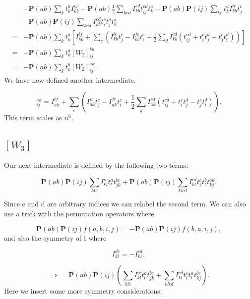 \documentclass[a4paper,norsk,11pt,twoside]{report}
\begin{document}
\begin{align}
& - \textbf{P}(ab) \sum_k t_k^a I_{kb}^{ij}
- \textbf{P}(ab) \frac{1}{2} \sum_{kcd} I_{kb}^{cd} t_{ij}^{cd} t_k^a
- \textbf{P}(ab) \textbf{P}(ij) \sum_{kc} t_k^a I_{kb}^{ic} t_j^c 
\nonumber \\
& - \textbf{P}(ab) \textbf{P}(ij) \sum_{kcd} I_{kb}^{cd} t_i^c t_j^d t_k^a
\nonumber \\
= &
- \textbf{P}(ab) \sum_k t_k^a \left[
I_{kb}^{ij} 
+ \sum_c \left( I_{kb}^{ic} t_j^c
- I_{kb}^{jc} t_i^c
+ \frac{1}{2} \sum_{d} I_{kb}^{cd} (t_{ij}^{cd}
+ t_i^c t_j^d - t_j^c t_i^d
) \right) \right]
\nonumber \\
= &
- \textbf{P}(ab) \sum_k t_k^a [W_2]_{ij}^{kb} \nonumber \\
= &
- \textbf{P}(ab) \sum_k t_k^b [W_2]_{ij}^{ak} .
\end{align}
We have now defined another intermediate.

\begin{equation}
[W_2]_{ij}^{ak} = I_{ak}^{ij} 
+ \sum_c \left( I_{ak}^{ic} t_j^c
- I_{ak}^{jc} t_i^c
+ \frac{1}{2} \sum_{d} I_{ak}^{cd} (t_{ij}^{cd}
+ t_i^c t_j^d - t_j^c t_i^d
) \right) . \label{intermedW2}
\end{equation}
This term scales as $n^6$.

\subsection{$[W_3]$}
Our next intermediate is defined by the following two terms:

\begin{equation}
\textbf{P}(ab) \textbf{P}(ij) \sum_{klc} I_{kl}^{ic} t_l^a t_{jk}^{bc}
+ \textbf{P}(ab) \textbf{P}(ij) \sum_{klcd} I_{kl}^{cd} t_i^c t_l^b t_{kj}^{ad} .
\end{equation}

Since c and d are arbitrary indices we can relabel the second term. We can also use a trick with the permutation operators where

\begin{equation}
\textbf{P}(ab) \textbf{P}(ij) f(a,b,i,j) = 
- \textbf{P}(ab) \textbf{P}(ij) f(b,a,i,j) ,
\end{equation}
and also the symmetry of I where

\begin{equation}
I_{kl}^{dc} = - I_{kl}^{cd} ,
\end{equation}

\begin{equation}
\Rightarrow =
\textbf{P}(ab) \textbf{P}(ij) \left(
\sum_{klc} I_{kl}^{ic} t_l^a t_{jk}^{bc}
+ \sum_{klcd} I_{kl}^{cd} t_i^c t_l^a t_{kj}^{bc}
\right) .
\end{equation}
Here we insert some more symmetry considerations.
\end{document}
